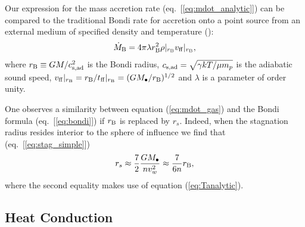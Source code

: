 \documentclass[usenatbib,fleqn]{mn2e}
\newcommand{\rs}{r_s}
\newcommand{\Mbh}[1][]{M_{\bullet#1}}
\newcommand{\vwO}{v_{w}}
\newcommand{\tff}{t_{\rm ff}}
\begin{document}

Our expression for the mass accretion rate (eq.~[\ref{eq:mdot_analytic}]) can be compared to the traditional Bondi rate for accretion onto a point source from an external medium of specified density and temperature (\citealt{Bondi52}):
\begin{align}
  \dot{M}_{\rm B} =4\pi \lambda r_{\rm B}^2 \rho|_{r_{\rm B}}v_{\rm ff}|_{r_{\rm B}},
\label{eq:bondi}
\end{align}
where $r_{\rm B} \equiv GM/c_{\rm s,ad}^{2}$ is the Bondi radius, $c_{\rm s,ad} = \sqrt{\gamma kT/\mu m_p}$ is the adiabatic sound speed, $v_{\rm ff}|_{r_{\rm B}} = r_{\rm B}/t_{\rm ff}|_{r_{\rm B}} = (GM_{\bullet}/r_{\rm B})^{1/2}$ and $\lambda$ is a parameter of order unity.  

One observes a similarity between equation (\ref{eq:mdot_gas}) and the Bondi formula (eq.~[\ref{eq:bondi}]) if $r_{\rm B}$ is replaced by $\rs$.  Indeed, when the stagnation radius resides interior to the sphere of influence we find that (eq.~[\ref{eq:stag_simple}])
\begin{align}
  \rs\approx\frac{7}{2}\frac{G \Mbh}{n \vwO^2} \approx \frac{7}{6n}r_{\rm B},
  \label{eq:rs_simple}
\end{align}
where the second equality makes use of equation (\ref{eq:Tanalytic}).  

\subsection{Heat Conduction}
\label{sec:conductivity}
\end{document}
